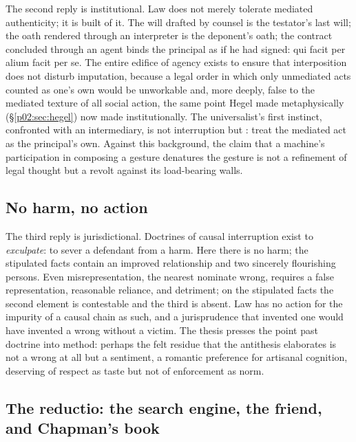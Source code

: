 The second reply is institutional. Law does not merely tolerate mediated authenticity; it is built of it. The will drafted by counsel is the testator's last will; the oath rendered through an interpreter is the deponent's oath; the contract concluded through an agent binds the principal as if he had signed: qui facit per alium facit per se. The entire edifice of agency exists to ensure that interposition does not disturb imputation, because a legal order in which only unmediated acts counted as one's own would be unworkable and, more deeply, false to the mediated texture of all social action, the same point Hegel made metaphysically (\S\ref{p02:sec:hegel}) now made institutionally. The universalist's first instinct, confronted with an intermediary, is not interruption but : treat the mediated act as the principal's own. Against this background, the claim that a machine's participation in composing a gesture denatures the gesture is not a refinement of legal thought but a revolt against its load-bearing walls.

\subsection{No harm, no action}
\label{p02:sec:thesis-noharm}

The third reply is jurisdictional. Doctrines of causal interruption exist to \emph{exculpate}: to sever a defendant from a harm. Here there is no harm; the stipulated facts contain an improved relationship and two sincerely flourishing persons. Even misrepresentation, the nearest nominate wrong, requires a false representation, reasonable reliance, and detriment; on the stipulated facts the second element is contestable and the third is absent. Law has no action for the impurity of a causal chain as such, and a jurisprudence that invented one would have invented a wrong without a victim. The thesis presses the point past doctrine into method: perhaps the felt residue that the antithesis elaborates is not a wrong at all but a sentiment, a romantic preference for artisanal cognition, deserving of respect as taste but not of enforcement as norm.

\subsection{The reductio: the search engine, the friend, and Chapman's book}
\label{p02:sec:thesis-reductio}

